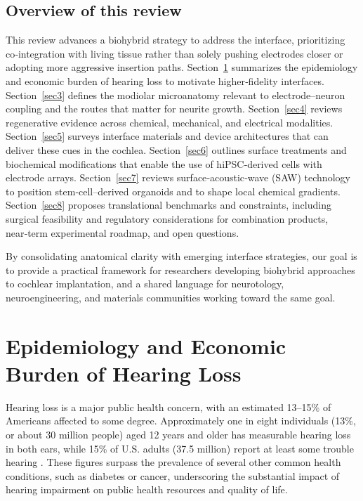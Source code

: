 \documentclass[referee,pdflatex, sn-vancouver-num]{sn-jnl}%
\theoremstyle{thmstyleone}%
\theoremstyle{thmstyletwo}%
\theoremstyle{thmstylethree}%
\begin{document}
\subsection{Overview of this review}
This review advances a biohybrid strategy to address the interface, prioritizing co‑integration with living tissue rather than solely pushing electrodes closer or adopting more aggressive insertion paths. Section~\ref{sec2} summarizes the epidemiology and economic burden of hearing loss to motivate higher‑fidelity interfaces. Section~\ref{sec3} defines the modiolar microanatomy relevant to electrode–neuron coupling and the routes that matter for neurite growth. Section~\ref{sec4} reviews regenerative evidence across chemical, mechanical, and electrical modalities. Section~\ref{sec5} surveys interface materials and device architectures that can deliver these cues in the cochlea. Section~\ref{sec6} outlines surface treatments and biochemical modifications that enable the use of hiPSC‑derived cells with electrode arrays. Section~\ref{sec7} reviews surface‑acoustic‑wave (SAW) technology to position stem‑cell–derived organoids and to shape local chemical gradients. Section~\ref{sec8} proposes translational benchmarks and constraints, including surgical feasibility and regulatory considerations for combination products, near‑term experimental roadmap, and open questions.

By consolidating anatomical clarity with emerging interface strategies, our goal is to provide a practical framework for researchers developing biohybrid approaches to cochlear implantation, and a shared language for neurotology, neuroengineering, and materials communities working toward the same goal.

\section{Epidemiology and Economic Burden of Hearing Loss}\label{sec2}
\noindent 
Hearing loss is a major public health concern, with an estimated 13--15\% of Americans affected to some degree. Approximately one in eight individuals (13\%, or about 30 million people) aged 12 years and older has measurable hearing loss in both ears, while 15\% of U.S. adults (37.5 million) report at least some trouble hearing \cite{nidcd_2021, cdc2010, cdc2021, wilson2014}. These figures surpass the prevalence of several other common health conditions, such as diabetes or cancer, underscoring the substantial impact of hearing impairment on public health resources and quality of life.
\end{document}

